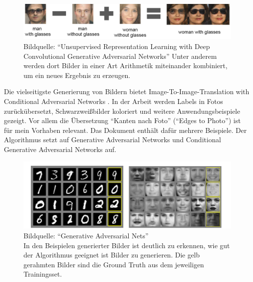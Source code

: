 \begin{figure}[h]
	\centering
	\includegraphics[width=1.0\textwidth]{bilder/image_arithmetic.png}
	\caption[Bildarithmetik]{Bildquelle: ``Unsupervised Representation Learning with Deep Convolutional Generative Adversarial Networks'' \cite{radford2016unsupervised} \newline Unter anderem werden dort Bilder in einer Art Arithmetik miteinander kombiniert, um ein neues Ergebnis zu erzeugen.}
	\label{fig:unsupervisedexamples}
\end{figure}

Die vielseitigste Generierung von Bildern bietet Image-To-Image-Translation with Conditional Adversarial Networks \cite{isola2018imagetoimage}. In der Arbeit werden Labels in Fotos zurückübersetzt, Schwarzweißbilder koloriert und weitere Anwendungsbeispiele gezeigt. Vor allem die Übersetzung ``Kanten nach Foto'' (``Edges to Photo'') ist für mein Vorhaben relevant. Das Dokument enthält dafür mehrere Beispiele. Der Algorithmus setzt auf Generative Adversarial Networks \cite{goodfellow2014generative} und Conditional Generative Adversarial Networks \cite{mirza2014conditional} auf.

\begin{figure}[h]
	\centering
	\includegraphics[width=1.0\textwidth]{bilder/mnist_faces.png}
	\caption[GAN Beispielbilder]{Bildquelle: ``Generative Adversarial Nets'' \cite{goodfellow2014generative} \\
	In den Beispielen generierter Bilder ist deutlich zu erkennen, wie gut der Algorithmus geeignet ist Bilder zu generieren. Die gelb gerahmten Bilder sind die Ground Truth aus dem jeweiligen Trainingsset.}
	\label{fig:ganexamples}
\end{figure}

\pagebreak

